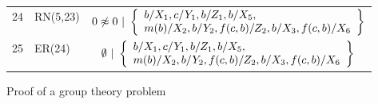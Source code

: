 \begin{figure}[htbp]
\begin{center}
\begin{tabular}{clc}
  24 & RN(5,23) &
  $ \clauseWithSubst{
      0 \not\approx 0
    }{ \left\{
      \begin{array}{l}
        \mapVar{X_1}b, \mapVar{Y_1}c, \mapVar{Z_1}b, \mapVar{X_5}b,  \\
        \mapVar{X_2}{m(b)}, \mapVar{Y_2}{b}, \mapVar{Z_2}{f(c,b)},
           \mapVar{X_3}{b}, \mapVar{X_6}{f(c,b)}
      \end{array} \right\}
    }$
  \\

  25 & ER(24) &
  $ \clauseWithSubst{
      \emptyset
    }{ \left\{
      \begin{array}{l}
        \mapVar{X_1}b, \mapVar{Y_1}c, \mapVar{Z_1}b, \mapVar{X_5}b,  \\
        \mapVar{X_2}{m(b)}, \mapVar{Y_2}{b}, \mapVar{Z_2}{f(c,b)},
           \mapVar{X_3}{b}, \mapVar{X_6}{f(c,b)}
      \end{array} \right\}
    }$
  \\

  \bottomrule
\end{tabular}
\caption{Proof of a group theory problem}
\label{fig:unit-sup-proof-example}
\end{center}
\end{figure}

